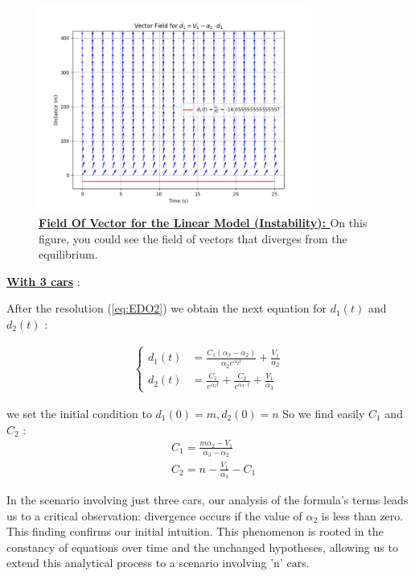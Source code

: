 \documentclass{article}
\begin{document}
		\begin{figure}[H]
			\centering
			\includegraphics[width=0.8\textwidth]{FieldOfVector_DV.png}
			\caption{\textbf{\underline{Field Of Vector for the Linear Model (Instability): }} On this figure, you could see the field of vectors that diverges from the equilibrium.}
			\label{fig:FV2}
		\end{figure}
		
		\textbf{\underline{With 3 cars}} : \newline\newline
		
		After the resolution (\ref{eq:EDO2}) we obtain the next equation for $d_1(t)$ and $d_2(t)$ : 
		
		\begin{align*}
			\begin{cases}
				d_1(t) &= \frac{C_1(\alpha_3-\alpha_2)}{\alpha_2e^{\alpha_2t}}+ \frac{V_1}{\alpha_2}\\
				d_2(t) &= \frac{C_1}{e^{\alpha_2t}} + \frac{C_2}{e^{\alpha_3 \cdot t}} + \frac{V_1}{\alpha_3}
			\end{cases}
		\end{align*}
		
		we set the initial condition to $d_1(0)=m, d_2(0)=n$ So we find easily $C_1$ and $C_2$ : 
		\begin{align*}
			&C_1=\frac{m\alpha_2-V_1}{\alpha_3-\alpha_2} \\
			&C_2=n-\frac{V_1}{\alpha_3} - C_1
		\end{align*}
		
		In the scenario involving just three cars, our analysis of the formula's terms leads us to a critical observation: divergence occurs if the value of $\alpha_2$ is less than zero. This finding confirms our initial intuition. This phenomenon is rooted in the constancy of equations over time and the unchanged hypotheses, allowing us to extend this analytical process to a scenario involving 'n' cars.
		
\end{document}
